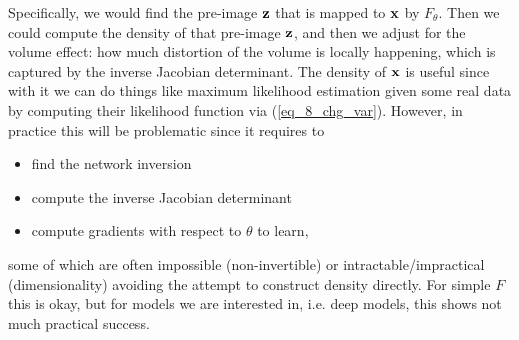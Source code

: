 \documentclass[../main.tex]{subfiles}
\begin{document}
Specifically, we would find the pre-image ${\bf z}$ that is mapped to ${\bf x}$ by $F_{\theta}$. Then we could compute the density of that pre-image ${\bf z}$, and then we adjust for the volume effect: how much distortion of the volume is locally happening, which is captured by the inverse Jacobian determinant. The density of ${\bf x}$ is useful since with it we can do things like maximum likelihood estimation given some real data by computing their likelihood function via (\ref{eq_8_chg_var}). However, in practice this will be problematic since it requires to 
\begin{itemize}
	\item find the network inversion
	\item compute the inverse Jacobian determinant
	\item compute gradients with respect to $\theta$ to learn,
\end{itemize}
some of which are often impossible (non-invertible) or intractable/impractical (dimensionality) avoiding the attempt to construct density directly. For simple $F$ this is okay, but for models we are interested in, i.e. deep models, this shows not much practical success.
\end{document}

